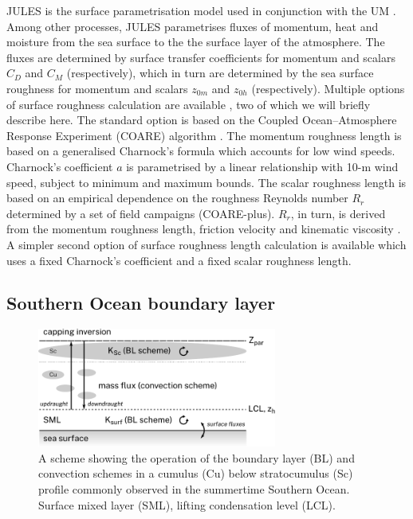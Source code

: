 JULES is the surface parametrisation model used in conjunction with the UM \citep{best2011,clark2011}.
Among other processes, JULES parametrises fluxes of momentum, heat and moisture from
the sea surface to the the surface layer of the atmosphere. The fluxes are
determined by surface transfer coefficients for momentum and scalars $C_D$ and
$C_M$ (respectively), which in turn are determined by the sea surface roughness
for momentum and scalars $z_{0m}$ and $z_{0h}$ (respectively). Multiple options
of surface roughness calculation are available \citep{umdp024}, two of which we will briefly
describe here. The standard option is based on the
Coupled Ocean--Atmosphere Response Experiment (COARE) algorithm
\citep{fairall2003}. The momentum roughness length is based on
a generalised Charnock's formula which accounts for low wind speeds.
Charnock's coefficient $a$ is parametrised by a linear
relationship with 10-m wind speed, subject to minimum and maximum bounds.
The scalar roughness length is based on an empirical dependence on the
roughness Reynolds number $R_r$ determined by a set of field campaigns (COARE-plus).
$R_r$, in turn, is derived from the momentum roughness length, friction velocity
and kinematic viscosity \citep{fairall2003}.
A simpler second option of surface roughness length calculation is available
which uses a fixed Charnock's coefficient and a fixed scalar roughness length.


\subsection{Southern Ocean boundary layer}
\label{sec:4:schemes}

\begin{figure}[t]
\centering
\includegraphics[width=0.7\textwidth]{chapter4/fig/scheme.pdf}
\caption[A scheme showing the operation of the boundary layer and convection schemes]{A scheme showing the operation of the boundary layer (BL)
and convection schemes in a cumulus (Cu) below stratocumulus (Sc) profile
commonly observed in the summertime Southern Ocean. Surface mixed layer (SML),
lifting condensation level (LCL).
}
\label{fig:4:scheme}
\end{figure}

